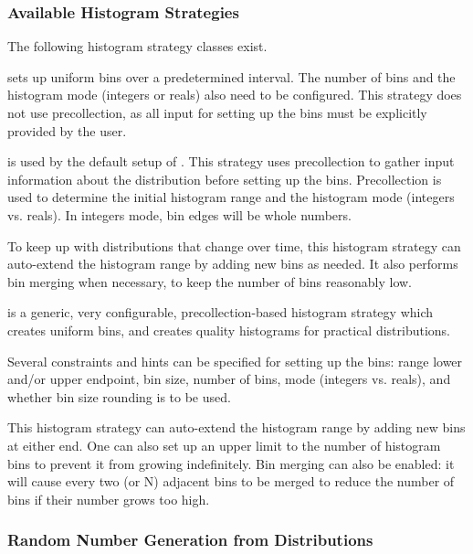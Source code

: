 \subsubsection{Available Histogram Strategies}
\label{sec:sim-lib:available-histogram-strategies}

The following histogram strategy classes exist.

 sets up uniform bins over
a predetermined interval. The number of bins and the histogram mode
(integers or reals) also need to be configured. This strategy does
not use precollection, as all input for setting up the bins must be
explicitly provided by the user.

 is used by the default setup of .
This strategy uses precollection to gather input information about the
distribution before setting up the bins. Precollection is used to determine
the initial histogram range and the histogram mode (integers vs. reals).
In integers mode, bin edges will be whole numbers.

To keep up with distributions that change over time, this histogram strategy
can auto-extend the histogram range by adding new bins as needed. It also
performs bin merging when necessary, to keep the number of bins reasonably low.

 is a generic, very configurable,
precollection-based histogram strategy which creates uniform bins, and
creates quality histograms for practical distributions.

Several constraints and hints can be specified for setting up the bins:
range lower and/or upper endpoint, bin size, number of bins,
mode (integers vs. reals), and whether bin size rounding is to be used.

This histogram strategy can auto-extend the histogram range by adding new
bins at either end. One can also set up an upper limit to the number of
histogram bins to prevent it from growing indefinitely. Bin merging can
also be enabled: it will cause every two (or N) adjacent bins to be
merged to reduce the number of bins if their number grows too high.


\subsubsection{Random Number Generation from Distributions}
\label{sec:sim-lib:random-number-generation-from-distributions}

